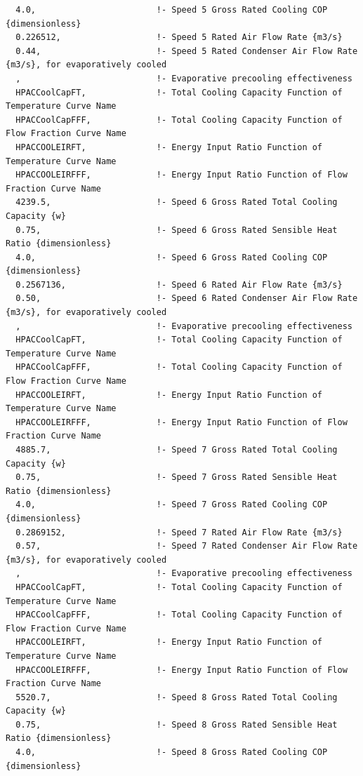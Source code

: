\begin{lstlisting}
  4.0,                        !- Speed 5 Gross Rated Cooling COP {dimensionless}
  0.226512,                   !- Speed 5 Rated Air Flow Rate {m3/s}
  0.44,                       !- Speed 5 Rated Condenser Air Flow Rate {m3/s}, for evaporatively cooled
  ,                           !- Evaporative precooling effectiveness
  HPACCoolCapFT,              !- Total Cooling Capacity Function of Temperature Curve Name
  HPACCoolCapFFF,             !- Total Cooling Capacity Function of Flow Fraction Curve Name
  HPACCOOLEIRFT,              !- Energy Input Ratio Function of Temperature Curve Name
  HPACCOOLEIRFFF,             !- Energy Input Ratio Function of Flow Fraction Curve Name
  4239.5,                     !- Speed 6 Gross Rated Total Cooling Capacity {w}
  0.75,                       !- Speed 6 Gross Rated Sensible Heat Ratio {dimensionless}
  4.0,                        !- Speed 6 Gross Rated Cooling COP {dimensionless}
  0.2567136,                  !- Speed 6 Rated Air Flow Rate {m3/s}
  0.50,                       !- Speed 6 Rated Condenser Air Flow Rate {m3/s}, for evaporatively cooled
  ,                           !- Evaporative precooling effectiveness
  HPACCoolCapFT,              !- Total Cooling Capacity Function of Temperature Curve Name
  HPACCoolCapFFF,             !- Total Cooling Capacity Function of Flow Fraction Curve Name
  HPACCOOLEIRFT,              !- Energy Input Ratio Function of Temperature Curve Name
  HPACCOOLEIRFFF,             !- Energy Input Ratio Function of Flow Fraction Curve Name
  4885.7,                     !- Speed 7 Gross Rated Total Cooling Capacity {w}
  0.75,                       !- Speed 7 Gross Rated Sensible Heat Ratio {dimensionless}
  4.0,                        !- Speed 7 Gross Rated Cooling COP {dimensionless}
  0.2869152,                  !- Speed 7 Rated Air Flow Rate {m3/s}
  0.57,                       !- Speed 7 Rated Condenser Air Flow Rate {m3/s}, for evaporatively cooled
  ,                           !- Evaporative precooling effectiveness
  HPACCoolCapFT,              !- Total Cooling Capacity Function of Temperature Curve Name
  HPACCoolCapFFF,             !- Total Cooling Capacity Function of Flow Fraction Curve Name
  HPACCOOLEIRFT,              !- Energy Input Ratio Function of Temperature Curve Name
  HPACCOOLEIRFFF,             !- Energy Input Ratio Function of Flow Fraction Curve Name
  5520.7,                     !- Speed 8 Gross Rated Total Cooling Capacity {w}
  0.75,                       !- Speed 8 Gross Rated Sensible Heat Ratio {dimensionless}
  4.0,                        !- Speed 8 Gross Rated Cooling COP {dimensionless}

\end{lstlisting}
